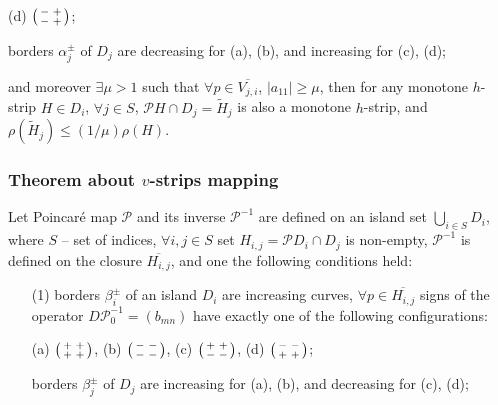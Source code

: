 \documentclass [10pt] {beamer}
\newenvironment{psm}
	{\left( \begin{smallmatrix}}
	{\end{smallmatrix} \right) }
\begin{document}
\begin{frame}
\begin{theorem}
\begin{enumerate}
\begin{center}
					(d) $\begin{psm} - & + \\ - & + \end{psm}$;		
				\end{center}
				borders $\alpha_j^{\pm}$ of $D_j$ are decreasing for (a), (b), and increasing for (c), (d);
		\end{enumerate}
		and moreover $\exists \mu > 1$ such that $\forall p \in \overline{V_{j,i}}$, $|a_{11}| \ge \mu$, then for any monotone $h$-strip $H \in D_i$, $\forall j \in S$, $\mathcal{P} H \cap D_j = \widetilde{H}_j$ is also a monotone $h$-strip, and $\rho(\widetilde{H}_j) \le (1 / \mu) \rho(H)$.
\end{theorem}
\end{frame}

\begin{frame}
	\frametitle{Theorem about $v$-strips mapping}
	\begin{theorem}
		Let Poincar\'e map $\mathcal{P}$ and its inverse $\mathcal{P}^{-1}$ are defined on an island set $\bigcup_{i \in S} D_i$, where $S$ -- set of indices, $\forall i, j \in S$ set $H_{i,j} = \mathcal{P} D_i \cap D_j$ is non-empty, $\mathcal{P}^{-1}$ is defined on the closure $\overline{H_{i,j}}$, and one the following conditions held:
		\begin{enumerate}
			\item[(1)] borders $\beta_i^{\pm}$ of an island $D_i$ are increasing curves, $\forall p \in \overline{H_{i,j}}$ signs of the operator $D \mathcal{P}_0^{-1} = (b_{mn})$ have exactly one of the following configurations:
				\begin{center}
					(a) $\begin{psm} + & + \\ + & + \end{psm}$, \quad
					(b) $\begin{psm} - & - \\ - & - \end{psm}$, \quad
					(c) $\begin{psm} + & + \\ - & - \end{psm}$, \quad
					(d) $\begin{psm} - & - \\ + & + \end{psm}$;
				\end{center}
				borders $\beta_j^{\pm}$ of $D_j$ are increasing for (a), (b), and decreasing for (c), (d);

\end{enumerate}
\end{theorem}
\end{frame}
\end{document}
